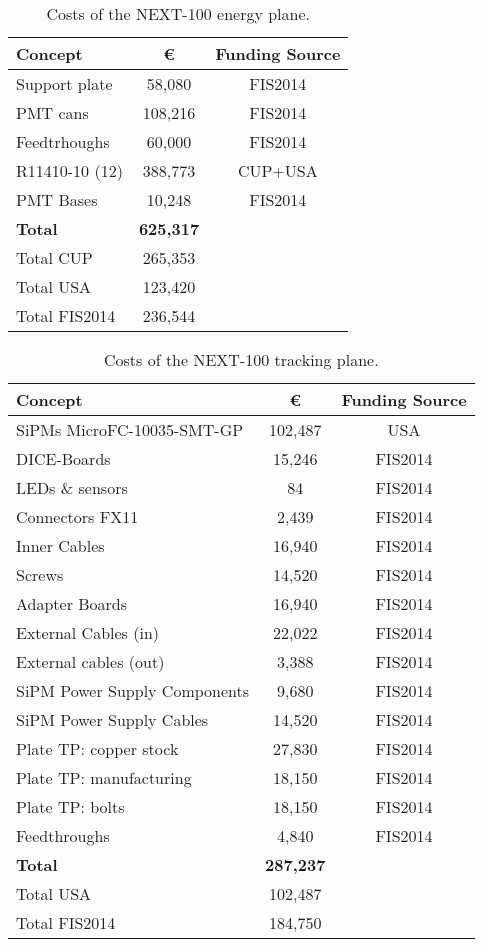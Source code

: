 \begin{table}[h!]
\begin{center}
\begin{tabular}{|l|c|c|}
\hline
 Concept & \euro & Funding Source \\
 \hline
Support plate	&	58,080 &	FIS2014 \\
PMT cans &	108,216 &	FIS2014 \\
Feedtrhoughs &	60,000 & FIS2014 \\
R11410-10 (12) &	388,773	& CUP+USA \\
PMT Bases &		10,248 &	FIS2014 \\
  \hline
{\bf Total}	&	{\bf 625,317}	& \\
Total CUP	&	265,353	&\\
Total USA	&	123,420 & \\
Total FIS2014	&	236,544 & \\	
 \hline\hline
\end{tabular}  
\caption{Costs of the NEXT-100 energy plane.}
\label{tab.n100:EP}
\end{center}
\end{table}

\begin{table}[h!]
\begin{center}
\begin{tabular}{|l|c|c|}
\hline
 Concept & \euro & Funding Source \\
 \hline
SiPMs MicroFC-10035-SMT-GP & 102,487 & USA \\
DICE-Boards &15,246 & FIS2014 \\
LEDs \& sensors &	84 & FIS2014 \\
Connectors FX11 & 2,439 & FIS2014 \\
Inner Cables & 16,940 & FIS2014 \\
Screws	& 14,520 & FIS2014 \\
Adapter Boards	 &	16,940 & FIS2014 \\
External Cables (in) &	22,022 & FIS2014 \\
External cables  (out) & 3,388 & FIS2014 \\
SiPM Power Supply Components & 9,680 & FIS2014 \\
SiPM Power Supply Cables &	14,520 & FIS2014 \\
Plate  TP:  copper stock &  27,830 & FIS2014 \\
Plate  TP:  manufacturing & 18,150 & FIS2014 \\
Plate  TP:  bolts & 	18,150 & FIS2014 \\
Feedthroughs & 4,840 & FIS2014 \\
  \hline
{\bf Total}	&	{\bf 287,237 }	& \\
  Total USA	&	102,487 	& \\
   Total FIS2014	&	184,750 	& \\
 \hline\hline
\end{tabular}  
\caption{Costs of the NEXT-100 tracking plane.}
\label{tab.n100:TP}
\end{center}
\end{table} 

